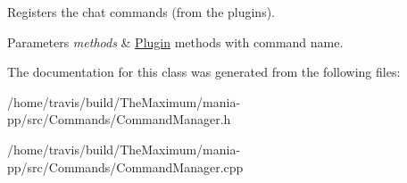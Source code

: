 Registers the chat commands (from the plugins). 


\begin{DoxyParams}{Parameters}
{\em methods} & \hyperlink{classPlugin}{Plugin} methods with command name. \\
\hline
\end{DoxyParams}


The documentation for this class was generated from the following files\-:\begin{DoxyCompactItemize}
\item 
/home/travis/build/\-The\-Maximum/mania-\/pp/src/\-Commands/Command\-Manager.\-h\item 
/home/travis/build/\-The\-Maximum/mania-\/pp/src/\-Commands/Command\-Manager.\-cpp\end{DoxyCompactItemize}
